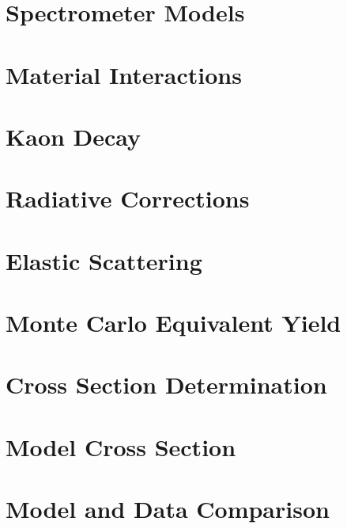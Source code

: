 \documentclass[
]{report}
\begin{document}
\hypertarget{Section-6.3}{%
\section{Spectrometer Models}\label{Section-6.3}}

\hypertarget{Section-6.4}{%
\section{Material Interactions}\label{Section-6.4}}

\hypertarget{Section-6.5}{%
\section{Kaon Decay}\label{Section-6.5}}

\hypertarget{Section-6.6}{%
\section{Radiative Corrections}\label{Section-6.6}}

\hypertarget{Section-6.7}{%
\section{Elastic Scattering}\label{Section-6.7}}

\label{Chapter-7}

\hypertarget{Section-7.1}{%
\section{Monte Carlo Equivalent Yield}\label{Section-7.1}}

\hypertarget{Section-7.2}{%
\section{Cross Section Determination}\label{Section-7.2}}

\hypertarget{Section-7.3}{%
\section{Model Cross Section}\label{Section-7.3}}

\hypertarget{Section-7.4}{%
\section{Model and Data Comparison}\label{Section-7.4}}
\end{document}
